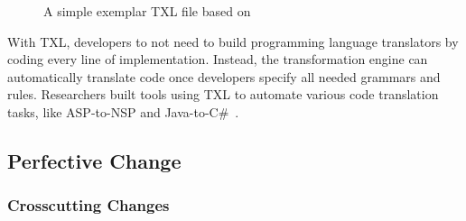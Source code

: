 \documentclass[runningheads,a4paper]{llncs}
\begin{document}
\begin{figure}
\centering
{}
\caption{A simple exemplar TXL file based on~\cite{txltour}}
\label{fig:txl}
\end{figure}
With TXL, developers to not need to build programming language translators by coding every line of implementation. Instead, the transformation engine can automatically translate code once developers specify all needed grammars and rules. Researchers built tools using TXL to automate various code translation tasks, like ASP-to-NSP and Java-to-C\#~\cite{Chu:08,Hassan:2005,El-Ramly:2006,Tonella:04}.


\subsection{Perfective Change}
\label{sec:perfective}

\subsubsection{Crosscutting Changes} 
\end{document}
